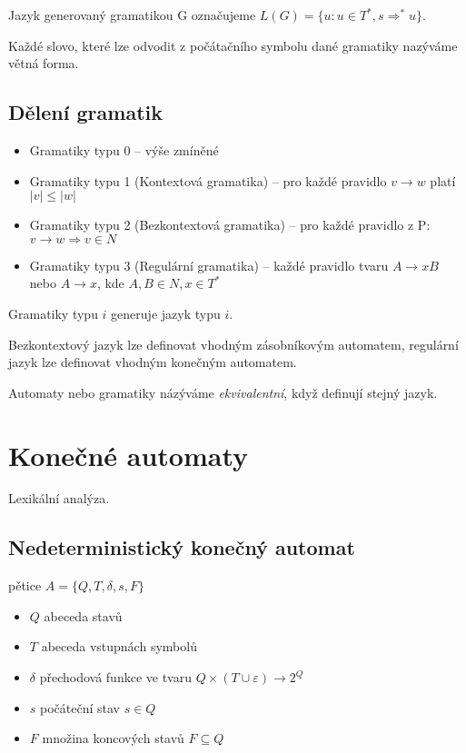 \documentclass[a4wide]{report}
\begin{document}
Jazyk generovaný gramatikou G označujeme $L(G) = \{u: u \in T^*, s \Rightarrow^* u\}$.

Každé slovo, které lze odvodit z počátačního symbolu dané gramatiky nazýváme větná forma.

\subsection{Dělení gramatik}

\begin{itemize}
	\item Gramatiky typu 0 -- výše zmíněné
	\item Gramatiky typu 1 (Kontextová gramatika) -- pro každé pravidlo $v \to w$ platí $|v| \leq |w|$
	\item Gramatiky typu 2 (Bezkontextová gramatika) -- pro každé pravidlo z P: $v \to w \Rightarrow v \in N$
	\item Gramatiky typu 3 (Regulární gramatika) -- každé pravidlo tvaru $A \to xB$ nebo $A \to x$, kde $A,B \in N, x \in T^*$
\end{itemize}

Gramatiky typu $i$ generuje jazyk typu $i$.

Bezkontextový jazyk lze definovat vhodným zásobníkovým automatem, regulární jazyk lze definovat vhodným konečným automatem.

Automaty nebo gramatiky názýváme \emph{ekvivalentní}, když definují stejný jazyk.

\section{Konečné automaty}

Lexikální analýza.

\subsection{Nedeterministický konečný automat}
pětice $A = \{Q, T, \delta, s, F\}$
\begin{itemize}
	\item $Q$ abeceda stavů
	\item $T$ abeceda vstupnách symbolů
	\item $\delta$ přechodová funkce ve tvaru $Q \times (T \cup \varepsilon) \to 2^Q$
	\item $s$ počáteční stav $s \in Q$
	\item $F$ množina koncových stavů $F \subseteq Q$
\end{itemize}
\end{document}

